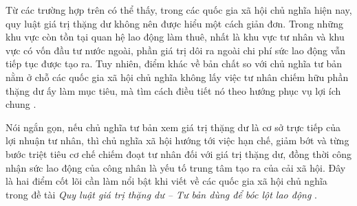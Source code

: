 Từ các trường hợp trên có thể thấy, trong các quốc gia xã hội chủ nghĩa hiện nay, quy luật giá trị thặng dư không nên được hiểu một cách giản đơn. Trong những khu vực còn tồn tại quan hệ lao động làm thuê, nhất là khu vực tư nhân và khu vực có vốn đầu tư nước ngoài, phần giá trị dôi ra ngoài chi phí sức lao động vẫn tiếp tục được tạo ra. Tuy nhiên, điểm khác về bản chất so với chủ nghĩa tư bản nằm ở chỗ các quốc gia xã hội chủ nghĩa không lấy việc tư nhân chiếm hữu phần thặng dư ấy làm mục tiêu, mà tìm cách điều tiết nó theo hướng phục vụ lợi ích chung \cite{gt,marx,lenin}.

Nói ngắn gọn, nếu chủ nghĩa tư bản xem giá trị thặng dư là cơ sở trực tiếp của lợi nhuận tư nhân, thì chủ nghĩa xã hội hướng tới việc hạn chế, giảm bớt và từng bước triệt tiêu cơ chế chiếm đoạt tư nhân đối với giá trị thặng dư, đồng thời công nhận sức lao động của công nhân là yếu tố trung tâm tạo ra của cải xã hội. Đây là hai điểm cốt lõi cần làm nổi bật khi viết về các quốc gia xã hội chủ nghĩa trong đề tài \textit{Quy luật giá trị thặng dư -- Tư bản dùng để bóc lột lao động} \cite{gt,marx,lenin,hienphap2013,bollaodong2019}.

